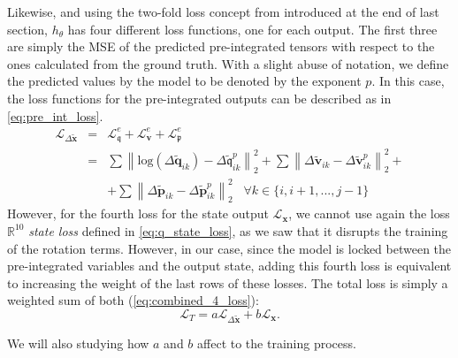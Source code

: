 Likewise, and using the two-fold loss concept from \cite{DBLP:journals/corr/ClarkWWMT17} introduced at the end of last section, $h_\theta$ has four different loss functions, one for each output.
The first three are simply the MSE of the predicted pre-integrated tensors with respect to the ones calculated from the ground truth. 
With a slight abuse of notation, we define the predicted values by the model to be denoted by the exponent $p$.
In this case, the loss functions for the pre-integrated outputs can be described as in \ref{eq:pre_int_loss}.
\begin{eqnarray}\label{eq:pre_int_loss}
    \mathcal{L}_{\Delta\mathbf{\tilde{x}}} & = & \mathcal{L}^e_{\mathbf{\mathfrak{q}}}+\mathcal{L}^e_\mathbf{v}+\mathcal{L}^e_\mathfrak{p} \nonumber\\
    & = & \sum{\left\|\textrm{log}\left(\Delta\mathbf{\tilde{q}}_{ik}\right)-\Delta\mathbf{\mathfrak{\tilde{q}}}^p_{ik}\right\|_2^2} + 
    \sum{\left\|\Delta\mathbf{\tilde{v}}_{ik}-\Delta\mathbf{\tilde{v}}^p_{ik}\right\|_2^2} +  \\
    & & + \sum{\left\|\Delta\mathbf{\tilde{p}}_{ik}-\Delta\mathbf{\tilde{p}}^p_{ik}\right\|_2^2} \;\;\; \forall k \in \{i, i+1, ..., j-1\} \nonumber
\end{eqnarray}
However, for the fourth loss for the state output $\mathcal{L}_\mathbf{x}$, we cannot use again the loss $\mathbb{R}^{10}$ \emph{state loss} defined in \ref{eq:q_state_loss}, as we saw that it disrupts the training of the rotation terms.
However, in our case, since the model is locked between the pre-integrated variables and the output state, adding this fourth loss is equivalent to increasing the weight of the last rows of these losses.
The total loss is simply a weighted sum of both (\ref{eq:combined_4_loss}):
\begin{equation}\label{eq:combined_4_loss}
    \mathcal{L}_T=a\mathcal{L}_{\Delta\mathbf{\tilde{x}}} + b\mathcal{L}_\mathbf{x}.
\end{equation}

We will also studying how $a$ and $b$ affect to the training process.

